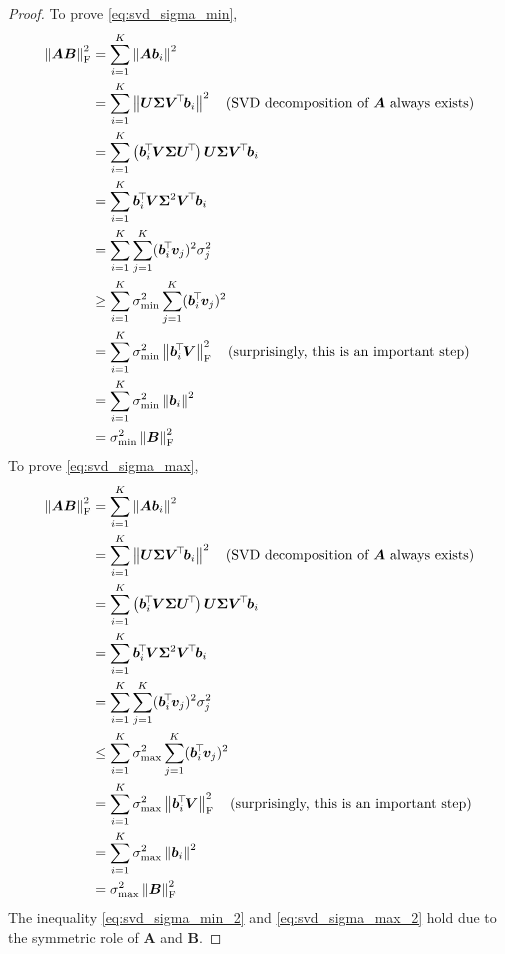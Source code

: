 \documentclass[11pt,a4paper]{article}
\begin{document}
\begin{proof}
    To prove \eqref{eq:svd_sigma_min},
    \begin{align*}
    \norm{\bm{A} \bm{B}}_{\rm F}^2 
    &= \sum^{K}_{i=1} \norm{\bm{A} \bm{b}_i}^2 \\
    &= \sum^{K}_{i=1} \norm{\bm{U} \boldsymbol \Sigma \bm{V}^{\T} \bm{b}_i}^2 \quad \text{(SVD decomposition of $\bm{A}$ always exists)}\\
    &= \sum^{K}_{i=1} \left( \bm{b}_i^{\T}\bm{V} \boldsymbol \Sigma  \bm{U}^{\T} \right) \bm{U} \boldsymbol \Sigma \bm{V}^{\T} \bm{b}_i \\
    &= \sum^{K}_{i=1} \bm{b}_i^{\T}\bm{V} \boldsymbol \Sigma^2 \bm{V}^{\T} \bm{b}_i \\
    &= \sum^{K}_{i=1} \sum^{K}_{j=1} (\bm{b}_i^{\T} \bm{v}_j)^2 \sigma_j^2 \\
    &\geq \sum^{K}_{i=1}\sigma_{\min}^2 \sum^{K}_{j=1} (\bm{b}_i^{\T} \bm{v}_j)^2  \\
    &= \sum^{K}_{i=1}\sigma_{\min}^2 \norm{\bm{b}_i^{\T} \bm{V}}_{\rm F}^2  \quad \text{(surprisingly, this is an important step)} \\
    &= \sum^{K}_{i=1}\sigma_{\min}^2 \norm{\bm{b}_i }^2 \\
    &= \sigma_{\min}^2 \norm{\bm{B}}_{\rm F}^2
    \end{align*} 
    To prove \eqref{eq:svd_sigma_max},
    \begin{align*}
    \norm{\bm{A} \bm{B}}_{\rm F}^2 
    &= \sum^{K}_{i=1} \norm{\bm{A} \bm{b}_i}^2 \\
    &= \sum^{K}_{i=1} \norm{\bm{U} \boldsymbol \Sigma \bm{V}^{\T} \bm{b}_i}^2 \quad \text{(SVD decomposition of $\bm{A}$ always exists)}\\
    &= \sum^{K}_{i=1} \left( \bm{b}_i^{\T}\bm{V} \boldsymbol \Sigma  \bm{U}^{\T} \right) \bm{U} \boldsymbol \Sigma \bm{V}^{\T} \bm{b}_i \\
    &= \sum^{K}_{i=1} \bm{b}_i^{\T}\bm{V} \boldsymbol \Sigma^2 \bm{V}^{\T} \bm{b}_i \\
    &= \sum^{K}_{i=1} \sum^{K}_{j=1} (\bm{b}_i^{\T} \bm{v}_j)^2 \sigma_j^2 \\
    &\leq \sum^{K}_{i=1}\sigma_{\max}^2 \sum^{K}_{j=1} (\bm{b}_i^{\T} \bm{v}_j)^2  \\
    &= \sum^{K}_{i=1}\sigma_{\max}^2 \norm{\bm{b}_i^{\T} \bm{V}}_{\rm F}^2  \quad \text{(surprisingly, this is an important step)} \\
    &= \sum^{K}_{i=1}\sigma_{\max}^2 \norm{\bm{b}_i }^2 \\
    &= \sigma_{\max}^2 \norm{\bm{B}}_{\rm F}^2
    \end{align*} 
    The inequality \eqref{eq:svd_sigma_min_2} and \eqref{eq:svd_sigma_max_2} hold due to the symmetric role of $\bm{A}$ and $\bm{B}$.
\end{proof}
\end{document}

